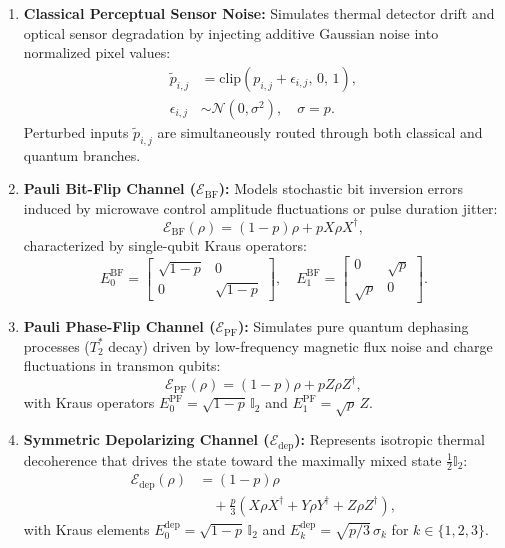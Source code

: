 \documentclass[pdflatex,sn-mathphys-num]{sn-jnl}%
\theoremstyle{thmstyleone}%
\theoremstyle{thmstyletwo}%
\theoremstyle{thmstylethree}%
\begin{document}
\begin{enumerate}
    \item \textbf{Classical Perceptual Sensor Noise:} Simulates thermal detector drift and optical sensor degradation by injecting additive Gaussian noise into normalized pixel values:
    \begin{align}
    \tilde{p}_{i,j} &= \mathrm{clip}\left( p_{i,j} + \epsilon_{i,j}, \, 0, \, 1 \right), \nonumber \\
    \epsilon_{i,j} &\sim \mathcal{N}(0, \sigma^2), \quad \sigma = p.
    \label{eq:gaussian_pixel_noise}
    \end{align}
    Perturbed inputs $\tilde{p}_{i,j}$ are simultaneously routed through both classical and quantum branches.
    \item \textbf{Pauli Bit-Flip Channel ($\mathcal{E}_{\mathrm{BF}}$):} Models stochastic bit inversion errors induced by microwave control amplitude fluctuations or pulse duration jitter:
    \begin{equation}
    \mathcal{E}_{\mathrm{BF}}(\rho) = (1 - p)\rho + p X \rho X^\dagger,
    \label{eq:bitflip_cptp}
    \end{equation}
    characterized by single-qubit Kraus operators:
    \begin{equation}
    E_0^{\mathrm{BF}} = \begin{bmatrix} \sqrt{1-p} & 0 \\ 0 & \sqrt{1-p} \end{bmatrix}, \quad E_1^{\mathrm{BF}} = \begin{bmatrix} 0 & \sqrt{p} \\ \sqrt{p} & 0 \end{bmatrix}.
    \label{eq:kraus_bitflip_matrix}
    \end{equation}
    \item \textbf{Pauli Phase-Flip Channel ($\mathcal{E}_{\mathrm{PF}}$):} Simulates pure quantum dephasing processes ($T_2^*$ decay) driven by low-frequency magnetic flux noise and charge fluctuations in transmon qubits:
    \begin{equation}
    \mathcal{E}_{\mathrm{PF}}(\rho) = (1 - p)\rho + p Z \rho Z^\dagger,
    \label{eq:phaseflip_cptp}
    \end{equation}
    with Kraus operators $E_0^{\mathrm{PF}} = \sqrt{1-p}\,\mathbb{I}_2$ and $E_1^{\mathrm{PF}} = \sqrt{p}\,Z$.
    \item \textbf{Symmetric Depolarizing Channel ($\mathcal{E}_{\mathrm{dep}}$):} Represents isotropic thermal decoherence that drives the state toward the maximally mixed state $\frac{1}{2}\mathbb{I}_2$:
    \begin{align}
    \mathcal{E}_{\mathrm{dep}}(\rho) &= (1 - p)\rho \nonumber \\
    &\quad + \frac{p}{3}\left( X\rho X^\dagger + Y\rho Y^\dagger + Z\rho Z^\dagger \right),
    \label{eq:depolarizing_cptp}
    \end{align}
    with Kraus elements $E_0^{\mathrm{dep}} = \sqrt{1-p}\,\mathbb{I}_2$ and $E_k^{\mathrm{dep}} = \sqrt{p/3}\,\sigma_k$ for $k \in \{1, 2, 3\}$.
\end{enumerate}
\end{document}
